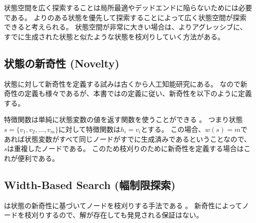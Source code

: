 状態空間を広く探索することは局所最適やデッドエンドに陥らないためには必要である。
よりのある状態を優先して探索することによって広く状態空間が探索できると考えられる。
状態空間が非常に大きい場合は、よりアグレッシブに、すでに生成された状態と似たような状態を枝刈りしていく方法がある。




\subsection{状態の新奇性 (Novelty)}
\label{sec:novelty}

状態に対して新奇性を定義する試みは古くから人工知能研究にある\cite{lehman2008exploiting}。
なので新奇性の定義も様々であるが、本書では\cite{geffner2015}の定義に従い、新奇性を以下のように定義する。


特徴関数は単純に状態変数の値を返す関数を使うことができる \cite{geffner2015, lipovetzky2015a}。
つまり状態$s = \{v_1, v_2,...,v_m\}$に対して特徴関数は$h_i = v_i$とする。
この場合、$w(s) = m$であれば状態変数がすべて同じノードがすでに生成済みであるということなので、$s$は重複したノードである。
このため枝刈りのために新奇性を定義する場合はこれが便利である。



\subsection{Width-Based Search (幅制限探索)}
\label{sec:width-based-search}

は状態の新奇性に基づいてノードを枝刈りする手法である \cite{lipovetzkyg12}。
新奇性によってノードを枝刈りするので、解が存在しても発見される保証はない。

